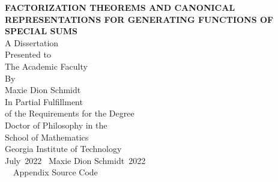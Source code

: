 \documentclass[12pt,reqno,a4letter]{article}
\title{\ManuscriptTitle}
\author{\ManuscriptAuthor}
\numberwithin{figure}{section}
\numberwithin{table}{section}
\numberwithin{equation}{section}
\theoremstyle{plain}
\numberwithin{theorem}{section}
\theoremstyle{definition}
\newcommand{\ManuscriptTitle}{Factorization theorems and canonical representations for generating functions of special sums}
\newcommand{\ManuscriptAuthor}{Maxie Dion Schmidt}
\newcommand{\ManuscriptDateMonth}{July}
\newcommand{\ManuscriptDateYear}{2022}
\newcommand{\ManuscriptCopyright}{\faCopyright}
\newcommand{\ManuscriptSourceCodeLicense}{\faCreativeCommons\ \ccShareAlike\ Appendix Source Code}
\newcommand{\TitlePageSmallSkip}{\vspace{0.5cm} \\}
\newcommand{\TitlePageBigSkip}{\vspace{1.25cm} \\}
\newcommand{\TitlePageHugeSkip}{\vspace{2cm} \\}
\begin{document}
 

\pagestyle{plain}
\setcounter{page}{1} %

\begin{titlepage}
   \begin{center}
       \vspace*{1cm}
       \large{\textbf{\MakeUppercase{\ManuscriptTitle}}}
       \TitlePageHugeSkip
       \normalsize A Dissertation \\ 
       \normalsize Presented to \\ 
       \normalsize The Academic Faculty
       \TitlePageBigSkip
       \normalsize By 
       \TitlePageBigSkip
       \ManuscriptAuthor
       \TitlePageBigSkip
       \normalsize In Partial Fulfillment \\ 
       \normalsize of the Requirements for the Degree \\ 
       \normalsize Doctor of Philosophy in the \\ 
       \normalsize School of Mathematics
       \TitlePageHugeSkip
       \normalsize Georgia Institute of Technology
       \TitlePageSmallSkip
       \ManuscriptDateMonth\ \ManuscriptDateYear 
       \vfill 
       \ManuscriptCopyright\ \ManuscriptAuthor\ \ManuscriptDateYear \\ 
       \ManuscriptSourceCodeLicense
   \end{center}
\end{titlepage}
\end{document}
